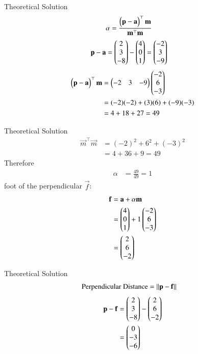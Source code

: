\documentclass{beamer}
\begin{document}
\begin{frame}{Theoretical Solution}
\begin{align}
\alpha &= \frac{\begin{pmatrix}\mathbf{p}-\mathbf{a}\end{pmatrix}^\top \mathbf{m}}{\mathbf{m}^\top \mathbf{m}}
\end{align}
\begin{align}
\mathbf{p}-\mathbf{a} &= \begin{pmatrix}2 \\ 3 \\ -8\end{pmatrix} - \begin{pmatrix}4 \\ 0 \\ 1\end{pmatrix} = \begin{pmatrix}-2 \\ 3 \\ -9\end{pmatrix}
\end{align}
\begin{align}
\begin{pmatrix}\mathbf{p}-\mathbf{a}\end{pmatrix}^\top \mathbf{m} &= \begin{pmatrix}-2 & 3 & -9\end{pmatrix} \begin{pmatrix}-2 \\ 6 \\ -3\end{pmatrix} \\
&= (-2)(-2) + (3)(6) + (-9)(-3) \\
&= 4 + 18 + 27 = 49
\end{align}
\end{frame}

\begin{frame}{Theoretical Solution}
\begin{align}
\vec{m}^\top \vec{m} &= (-2)^2 + 6^2 + (-3)^2 \\
&= 4 + 36 + 9 = 49
\end{align}
Therefore
\begin{align}
\alpha &= \frac{49}{49} = 1
\end{align}
foot of the perpendicular $\vec{f}$:
\begin{align}
\mathbf{f} &= \mathbf{a} + \alpha\mathbf{m} \\
&= \begin{pmatrix}4 \\ 0 \\ 1\end{pmatrix} + 1 \begin{pmatrix}-2 \\ 6 \\ -3\end{pmatrix} \\
&= \begin{pmatrix}2 \\ 6 \\ -2\end{pmatrix}
\end{align}
\end{frame}

\begin{frame}{Theoretical Solution}
\begin{align}
\text{Perpendicular Distance} &= \left\lVert\mathbf{p}-\mathbf{f}\right\rVert
\end{align}
\begin{align}
\mathbf{p}-\mathbf{f} &= \begin{pmatrix}2 \\ 3 \\ -8\end{pmatrix} - \begin{pmatrix}2 \\ 6 \\ -2\end{pmatrix} \\
&=\begin{pmatrix}0 \\ -3 \\ -6\end{pmatrix}
\end{align}
\end{frame}
\end{document}
